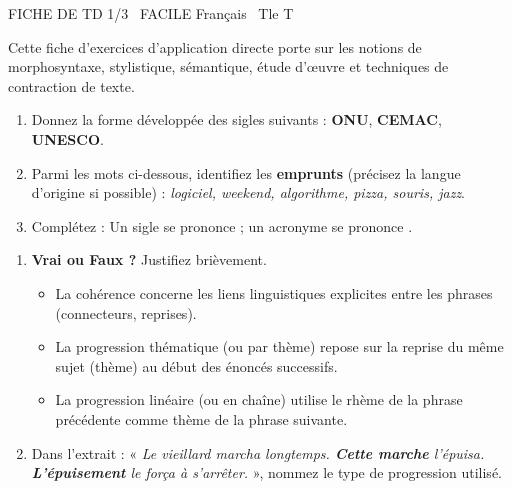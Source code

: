 \documentclass[11pt]{article}
\begin{document}
\begin{tcolorbox}[enhanced,colback=popink,colframe=popink,arc=10pt,boxrule=0pt,left=12pt,right=12pt,top=9pt,bottom=9pt]
{\color{white}\popxbold\small FICHE DE TD 1/3 \textbullet\ FACILE \hfill Français \textbullet\ Tle T\par}
\end{tcolorbox}
\vspace{4pt}
Cette fiche d'exercices d'application directe porte sur les notions de morphosyntaxe, stylistique, sémantique, étude d'œuvre et techniques de contraction de texte.

\begin{exercice}
\begin{enumerate}
    \item Donnez la forme développée des sigles suivants : \textbf{ONU}, \textbf{CEMAC}, \textbf{UNESCO}.
    \item Parmi les mots ci-dessous, identifiez les \textbf{emprunts} (précisez la langue d'origine si possible) : \textit{logiciel, weekend, algorithme, pizza, souris, jazz}.
    \item Complétez : Un sigle se prononce \underline{\hspace{4cm}} ; un acronyme se prononce \underline{\hspace{4cm}}.
\end{enumerate}
\end{exercice}

\begin{exercice}
\begin{enumerate}
    \item \textbf{Vrai ou Faux ?} Justifiez brièvement.
    \begin{itemize}
        \item[a)] La cohérence concerne les liens linguistiques explicites entre les phrases (connecteurs, reprises).
        \item[b)] La progression thématique (ou par thème) repose sur la reprise du même sujet (thème) au début des énoncés successifs.
        \item[c)] La progression linéaire (ou en chaîne) utilise le rhème de la phrase précédente comme thème de la phrase suivante.
    \end{itemize}
    \item Dans l'extrait : « \textit{Le vieillard marcha longtemps. \textbf{Cette marche} l'épuisa. \textbf{L'épuisement} le força à s'arrêter.} », nommez le type de progression utilisé.
\end{enumerate}
\end{exercice}
\end{document}
